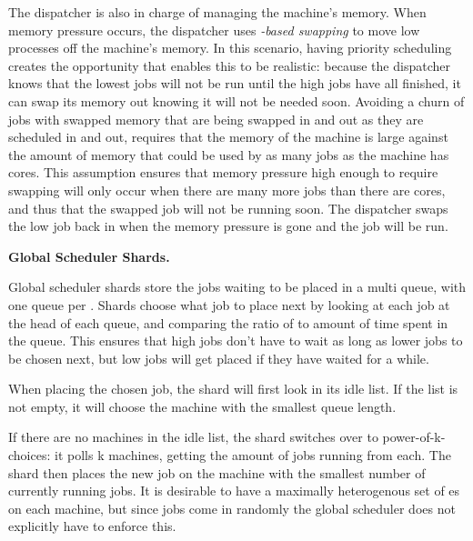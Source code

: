 The dispatcher is also in charge of managing the machine's memory. When memory
pressure occurs, the dispatcher uses \textit{\class{}-based swapping} to move low
\class{} processes off the machine's memory. In this scenario, having priority
scheduling creates the opportunity that enables this to be realistic: because
the dispatcher knows that the lowest \class{} jobs will not be run until the
high \class{} jobs have all finished, it can swap its memory out knowing it will
not be needed soon. Avoiding a churn of jobs with swapped memory that are being
swapped in and out as they are scheduled in and out, requires that the memory of
the machine is large against the amount of memory that could be used by as many
jobs as the machine has cores. This assumption ensures that memory pressure high
enough to require swapping will only occur when there are many more jobs than
there are cores, and thus that the swapped job will not be running soon. The
dispatcher swaps the low \class{} job back in when the memory pressure is gone
and the job will be run.



\textbf{Global Scheduler Shards.}

Global scheduler shards store the jobs waiting to be placed in a multi queue,
with one queue per \priceclass{}. Shards choose what job to place next by
looking at each job at the head of each queue, and comparing the ratio of
\class{} to amount of time spent in the queue. This ensures that high \class{}
jobs don't have to wait as long as lower \class{} jobs to be chosen next, but
low \class{} jobs will get placed if they have waited for a while.

When placing the chosen job, the shard will first look in its idle list. If the
list is not empty, it will choose the machine with the smallest queue length.

If there are no machines in the idle list, the shard switches over to
power-of-k-choices: it polls k machines, getting the amount of jobs running from
each. The shard then places the new job on the machine with the smallest number
of currently running jobs. It is desirable to have a maximally heterogenous set
of \class{}es on each machine, but since jobs come in randomly the global
scheduler does not explicitly have to enforce this.

